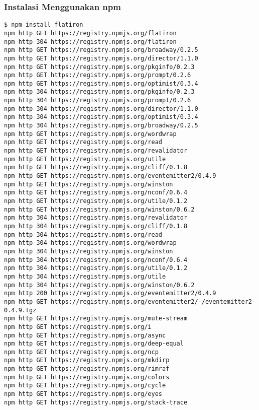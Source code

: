 \subsubsection{Instalasi Menggunakan npm}
\lstset{language=bash,caption=Proses instalasi Flatiron}
\begin{lstlisting}
$ npm install flatiron
npm http GET https://registry.npmjs.org/flatiron
npm http 304 https://registry.npmjs.org/flatiron
npm http GET https://registry.npmjs.org/broadway/0.2.5
npm http GET https://registry.npmjs.org/director/1.1.0
npm http GET https://registry.npmjs.org/pkginfo/0.2.3
npm http GET https://registry.npmjs.org/prompt/0.2.6
npm http GET https://registry.npmjs.org/optimist/0.3.4
npm http 304 https://registry.npmjs.org/pkginfo/0.2.3
npm http 304 https://registry.npmjs.org/prompt/0.2.6
npm http 304 https://registry.npmjs.org/director/1.1.0
npm http 304 https://registry.npmjs.org/optimist/0.3.4
npm http 304 https://registry.npmjs.org/broadway/0.2.5
npm http GET https://registry.npmjs.org/wordwrap
npm http GET https://registry.npmjs.org/read
npm http GET https://registry.npmjs.org/revalidator
npm http GET https://registry.npmjs.org/utile
npm http GET https://registry.npmjs.org/cliff/0.1.8
npm http GET https://registry.npmjs.org/eventemitter2/0.4.9
npm http GET https://registry.npmjs.org/winston
npm http GET https://registry.npmjs.org/nconf/0.6.4
npm http GET https://registry.npmjs.org/utile/0.1.2
npm http GET https://registry.npmjs.org/winston/0.6.2
npm http 304 https://registry.npmjs.org/revalidator
npm http 304 https://registry.npmjs.org/cliff/0.1.8
npm http 304 https://registry.npmjs.org/read
npm http 304 https://registry.npmjs.org/wordwrap
npm http 304 https://registry.npmjs.org/winston
npm http 304 https://registry.npmjs.org/nconf/0.6.4
npm http 304 https://registry.npmjs.org/utile/0.1.2
npm http 304 https://registry.npmjs.org/utile
npm http 304 https://registry.npmjs.org/winston/0.6.2
npm http 200 https://registry.npmjs.org/eventemitter2/0.4.9
npm http GET https://registry.npmjs.org/eventemitter2/-/eventemitter2-0.4.9.tgz
npm http GET https://registry.npmjs.org/mute-stream
npm http GET https://registry.npmjs.org/i
npm http GET https://registry.npmjs.org/async
npm http GET https://registry.npmjs.org/deep-equal
npm http GET https://registry.npmjs.org/ncp
npm http GET https://registry.npmjs.org/mkdirp
npm http GET https://registry.npmjs.org/rimraf
npm http GET https://registry.npmjs.org/colors
npm http GET https://registry.npmjs.org/cycle
npm http GET https://registry.npmjs.org/eyes
npm http GET https://registry.npmjs.org/stack-trace

\end{lstlisting}
